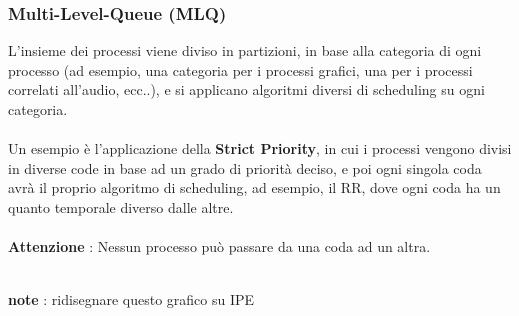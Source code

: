 \documentclass[12pt, letterpaper]{article}
\newcommand{\acc}{\\\hphantom{}\\}
\begin{document}
\subsubsection{Multi-Level-Queue (MLQ)}
L'insieme dei processi viene diviso in partizioni, in base alla categoria 
di ogni processo (ad esempio, una categoria per i processi grafici, una per i processi 
 correlati all'audio, ecc..), e si applicano algoritmi diversi di scheduling 
 su ogni categoria. \acc Un esempio è l'applicazione della \textbf{Strict Priority}, 
 in cui i processi vengono divisi in diverse code in base ad un grado di priorità 
 deciso, e poi ogni singola coda avrà il proprio algoritmo di scheduling, ad esempio, 
 il RR, dove ogni coda ha un quanto temporale diverso dalle altre.
  \acc \textbf{Attenzione} : Nessun processo può passare da una coda ad un altra.
  \begin{figure}[h]
\end{figure}\\
\color{red}\textbf{note }: ridisegnare questo grafico su IPE\color{black}
\end{document}
